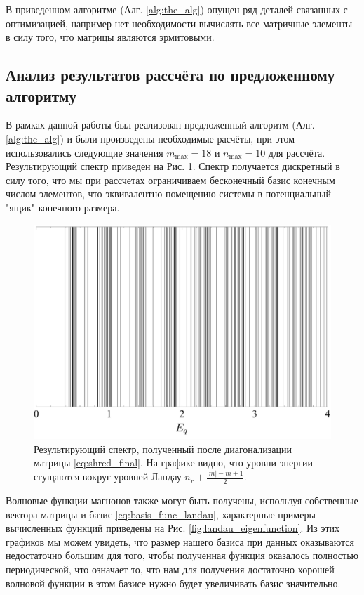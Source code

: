 \documentclass[a4paper,article,14pt]{extarticle}
\begin{document}
В приведенном алгоритме (Алг. \ref{alg:the_alg}) опущен ряд деталей связанных с оптимизацией, например нет необходимости вычислять все матричные элементы в силу того, что матрицы являются эрмитовыми.


\pagebreak
\subsection{ Анализ результатов рассчёта по предложенному алгоритму }

В рамках данной работы был реализован предложенный алгоритм (Алг. \ref{alg:the_alg}) и были произведены необходимые расчёты, при этом использовались следующие значения $m_\text{max}=18$ и $n_\text{max}=10$ для рассчёта. Результирующий спектр приведен на Рис.  \ref{fig:landau_spectrum}. Спектр получается дискретный в силу того, что мы при рассчетах ограничиваем бесконечный базис конечным числом элементов, что эквивалентно помещению системы в потенциальный "ящик" конечного размера.

\begin{figure}[t]
\centering	
\includegraphics[width=0.9\columnwidth]{images/spectrum_landau.pdf}
\caption{Результирующий спектр, полученный после диагонализации матрицы \eqref{eq:shred_final}. На графике видно, что уровни энергии сгущаются вокруг уровней Ландау $n_r + \frac{|m| - m + 1}{2}$. }
\label{fig:landau_spectrum}
\end{figure}


Волновые функции магнонов также могут быть получены, используя собственные вектора матрицы и базис \eqref{eq:basis_func_landau}, характерные примеры вычисленных функций приведены на Рис. \ref{fig:landau_eigenfunction}. Из этих графиков мы можем увидеть, что размер нашего базиса при данных оказываются недостаточно большим для того, чтобы полученная функция оказалось полностью периодической, что означает то, что нам для получения достаточно хорошей волновой функции в этом базисе нужно будет увеличивать базис значительно.
\end{document}
